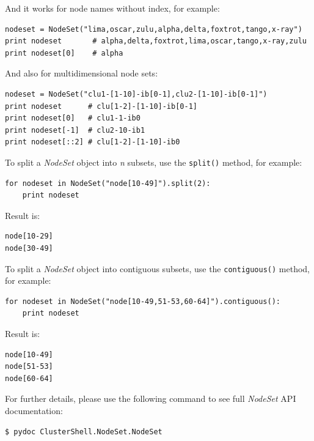 \documentclass[english,a4paper]{csuserguide}
\newcommand{\NodeSet}{\textit{NodeSet}\xspace}
\begin{document}
And it works for node names without index, for example:
\medskip
\begin{lstlisting}[breaklines=true, breakatwhitespace=true]
nodeset = NodeSet("lima,oscar,zulu,alpha,delta,foxtrot,tango,x-ray")
print nodeset       # alpha,delta,foxtrot,lima,oscar,tango,x-ray,zulu
print nodeset[0]    # alpha
\end{lstlisting}

And also for multidimensional node sets:

\medskip
\begin{lstlisting}[breaklines=true, breakatwhitespace=true]
nodeset = NodeSet("clu1-[1-10]-ib[0-1],clu2-[1-10]-ib[0-1]")
print nodeset      # clu[1-2]-[1-10]-ib[0-1]
print nodeset[0]   # clu1-1-ib0
print nodeset[-1]  # clu2-10-ib1
print nodeset[::2] # clu[1-2]-[1-10]-ib0
\end{lstlisting}


\medskip
\label{class-NodeSet-split}

To split a \NodeSet object into \textit{n} subsets, use the \lstinline+split()+ method, for example:
\medskip
\begin{lstlisting}[breaklines=true, breakatwhitespace=true]
for nodeset in NodeSet("node[10-49]").split(2):
    print nodeset
\end{lstlisting}

Result is:
\medskip
\begin{lstlisting}[breaklines=true, breakatwhitespace=true]
node[10-29]
node[30-49]
\end{lstlisting}

\pagebreak[1]

\label{class-NodeSet-contiguous}
To split a \NodeSet object into contiguous subsets, use the \lstinline+contiguous()+ method, for example:
\medskip
\begin{lstlisting}[breaklines=true, breakatwhitespace=true]
for nodeset in NodeSet("node[10-49,51-53,60-64]").contiguous():
    print nodeset
\end{lstlisting}

Result is:
\medskip
\begin{lstlisting}[breaklines=true, breakatwhitespace=true]
node[10-49]
node[51-53]
node[60-64]
\end{lstlisting}

\bigskip

For further details, please use the following command to see full \NodeSet API documentation:
\begin{verbatim}
$ pydoc ClusterShell.NodeSet.NodeSet
\end{verbatim}
\end{document}
